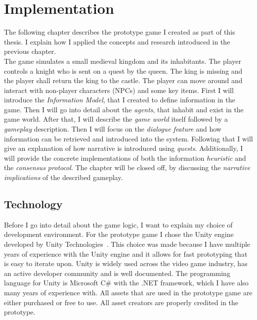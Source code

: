 \chapter{Implementation} %
The following chapter describes the prototype game I created as part of this thesis. I explain how I applied the concepts and research introduced in the previous chapter.\\
The game simulates a small medieval kingdom and its inhabitants. The player controls a knight who is sent on a quest by the queen. The king is missing and the player shall return the king to the castle. The player can move around and interact with non-player characters (NPCs) and some key items. First I will introduce the \textit{Information Model}, that I created to define information in the game. Then I will go into detail about the \textit{agents}, that inhabit and exist in the game world. After that, I will describe the \textit{game world} itself followed by a \textit{gameplay} description. Then I will focus on the \textit{dialogue feature} and how information can be retrieved and introduced into the system. Following that I will give an explanation of how narrative is introduced using \textit{quests}. Additionally, I will provide the concrete implementations of both the information \textit{heuristic} and the \textit{consensus protocol}. The chapter will be closed off, by discussing the \textit{narrative implications} of the described gameplay.
\section{Technology}
Before I go into detail about the game logic, I want to explain my choice of development environment. For the prototype game I chose the Unity engine developed by Unity Technologies~\cite{Unity2021}. This choice was made because I have multiple years of experience with the Unity engine and it allows for fast prototyping that is easy to iterate upon. Unity is widely used across the video game industry, has an active developer community and is well documented. The programming language for Unity is Microsoft C\# with the .NET framework, which I have also many years of experience with. All assets that are used in the prototype game are either purchased or free to use. All asset creators are properly credited in the prototype.
